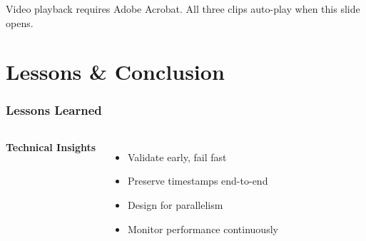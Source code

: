 \documentclass[serif, aspectratio=169, 9pt]{beamer}
\begin{document}
\begin{frame}
    \vspace{0.4em}
    \scriptsize
    Video playback requires Adobe Acrobat. All three clips auto-play when this slide opens.
\end{frame}


\section{Lessons \& Conclusion}

\begin{frame}
\frametitle{Lessons Learned}
    \begin{columns}
        \textbf{Technical Insights}
        \begin{itemize}
            \item Validate early, fail fast
            \item Preserve timestamps end-to-end
            \item Design for parallelism
            \item Monitor performance continuously

\end{itemize}
\end{columns}
\end{frame}
\end{document}
